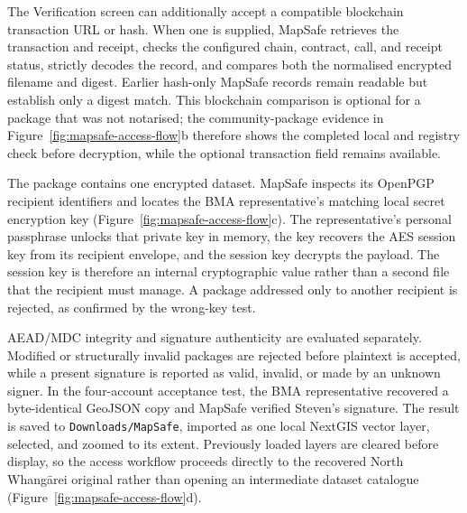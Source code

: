 \documentclass[]{interact}
\begin{document}
The Verification screen can additionally accept a compatible blockchain transaction URL or hash. When one is supplied, MapSafe retrieves the transaction and receipt, checks the configured chain, contract, call, and receipt status, strictly decodes the record, and compares both the normalised encrypted filename and digest. Earlier hash-only MapSafe records remain readable but establish only a digest match. This blockchain comparison is optional for a package that was not notarised; the community-package evidence in Figure~\ref{fig:mapsafe-access-flow}b therefore shows the completed local and registry check before decryption, while the optional transaction field remains available.

The package contains one encrypted dataset. MapSafe inspects its OpenPGP recipient identifiers and locates the BMA representative's matching local secret encryption key (Figure~\ref{fig:mapsafe-access-flow}c). The representative's personal passphrase unlocks that private key in memory, the key recovers the AES session key from its recipient envelope, and the session key decrypts the payload. The session key is therefore an internal cryptographic value rather than a second file that the recipient must manage. A package addressed only to another recipient is rejected, as confirmed by the wrong-key test.

AEAD/MDC integrity and signature authenticity are evaluated separately. Modified or structurally invalid packages are rejected before plaintext is accepted, while a present signature is reported as valid, invalid, or made by an unknown signer. In the four-account acceptance test, the BMA representative recovered a byte-identical GeoJSON copy and MapSafe verified Steven's signature. The result is saved to \texttt{Downloads/MapSafe}, imported as one local NextGIS vector layer, selected, and zoomed to its extent. Previously loaded layers are cleared before display, so the access workflow proceeds directly to the recovered North Whang\={a}rei original rather than opening an intermediate dataset catalogue (Figure~\ref{fig:mapsafe-access-flow}d).
\FloatBarrier

\end{document}
